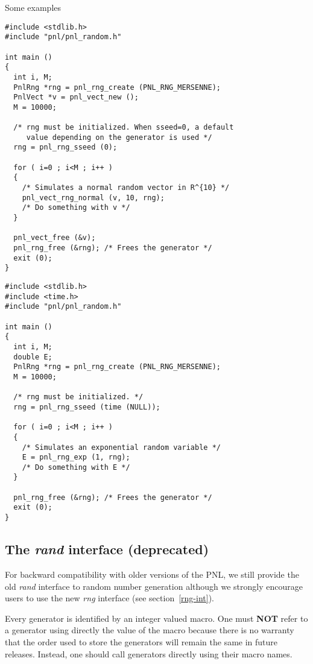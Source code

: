 Some examples
\begin{verbatim}
#include <stdlib.h>
#include "pnl/pnl_random.h"

int main ()
{
  int i, M;
  PnlRng *rng = pnl_rng_create (PNL_RNG_MERSENNE);
  PnlVect *v = pnl_vect_new ();
  M = 10000;

  /* rng must be initialized. When sseed=0, a default 
     value depending on the generator is used */
  rng = pnl_rng_sseed (0);

  for ( i=0 ; i<M ; i++ )
  {
    /* Simulates a normal random vector in R^{10} */
    pnl_vect_rng_normal (v, 10, rng);
    /* Do something with v */
  }

  pnl_vect_free (&v);
  pnl_rng_free (&rng); /* Frees the generator */
  exit (0);
}
\end{verbatim}

\begin{verbatim}
#include <stdlib.h>
#include <time.h>
#include "pnl/pnl_random.h"

int main ()
{
  int i, M;
  double E;
  PnlRng *rng = pnl_rng_create (PNL_RNG_MERSENNE);
  M = 10000;

  /* rng must be initialized. */
  rng = pnl_rng_sseed (time (NULL));

  for ( i=0 ; i<M ; i++ )
  {
    /* Simulates an exponential random variable */
    E = pnl_rng_exp (1, rng);
    /* Do something with E */
  }

  pnl_rng_free (&rng); /* Frees the generator */
  exit (0);
}
\end{verbatim}





\subsection{The {\em rand} interface (deprecated)}
\label{rand-int}

For backward compatibility with older versions of the PNL, we still provide the old
{\em rand} interface to random number generation although we strongly encourage users
to use the new {\em rng} interface (see section~\ref{rng-int}).

Every generator is identified by an integer valued macro. One must {\bf NOT} refer
to a generator using directly the value of the macro  because there
is no warranty that the order used to store the generators will remain the same in
future releases.  Instead, one should call generators directly using their macro
names.

